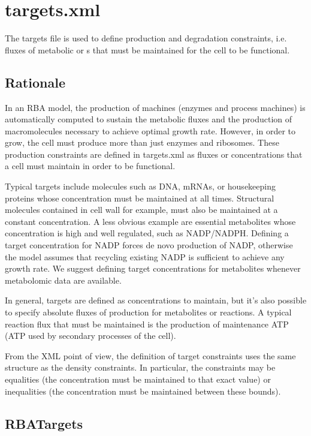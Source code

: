 
\section{targets.xml}

The targets file is used to define production and degradation constraints,
i.e. fluxes of metabolic \species{} or \macromolecule{}s that must be maintained
for the cell to be functional.

\subsection{Rationale}

In an RBA model, the production of machines (enzymes and process machines)
is automatically computed to sustain the metabolic fluxes and the production
of macromolecules necessary to achieve optimal growth rate.
However, in order to grow, the cell must produce more than just enzymes and ribosomes.
These production constraints are defined in targets.xml as fluxes or concentrations
that a cell must maintain in order to be functional.

Typical targets include molecules such as DNA, mRNAs, or housekeeping proteins
whose concentration must be maintained at all times.
Structural molecules contained in cell wall for example, must also be
maintained at a constant concentration.
A less obvious example are essential metabolites whose concentration
is high and well regulated, such as NADP/NADPH.\@
Defining a target concentration for NADP forces de novo production of NADP,
otherwise the model assumes that recycling existing NADP is sufficient to achieve any growth rate.
We suggest defining target concentrations for metabolites whenever metabolomic data are available.

In general, targets are defined as concentrations to maintain,
but it's also possible to specify absolute fluxes of production for metabolites or reactions.
A typical reaction flux that must be maintained is the production of maintenance ATP
(ATP used by secondary processes of the cell).

From the XML point of view, the definition of target constraints uses the same structure
as the density constraints.
In particular, the constraints may be equalities
(the concentration must be maintained to that exact value)
or inequalities (the concentration must be maintained between these bounds).

\subsection{RBATargets}
\label{sec:rba_targets}

